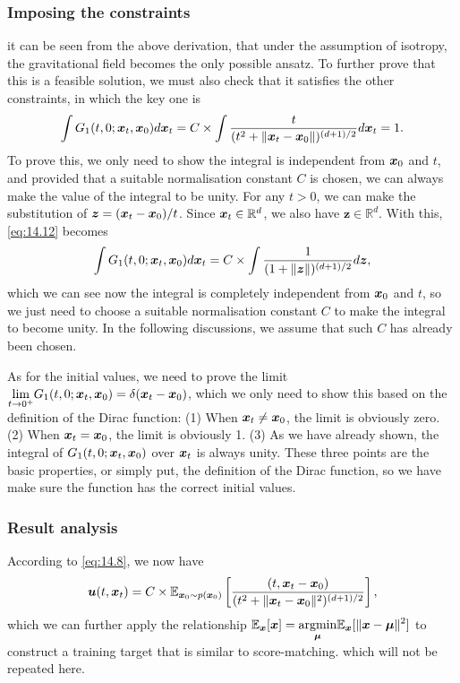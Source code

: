 \subsubsection{Imposing the constraints}
it can be seen from the above derivation, that under the assumption of isotropy, the gravitational field becomes the only possible ansatz. To further prove that this is a feasible solution, we must also check that it satisfies the other constraints, in which the key one is 
\begin{equation}
    \label{eq:14.12}
    \int G_{1}(t,0;\bm{x}_{t},\bm{x}_0)d\bm{x}_{t}=C\times\int\frac{t}{(t^2+\|\bm{x}_{t}-\bm{x}_0\|)^{(d+1)/2}}d\bm{x}_{t}=1.
\end{equation}
To prove this, we only need to show the integral is independent from $\bm{x}_0$ and $t$, and provided that a suitable normalisation constant $C$ is chosen, we can always make the value of the integral to be unity. For any $t>0$, we can make the substitution of $\bm{z}=(\bm{x}_{t}-\bm{x}_0)/t$. Since $\bm{x}_{t}\in\mathbb{R}^d$, we also have $\bm{z}\in\mathbb{R}^d$. With this, \cref{eq:14.12} becomes
\begin{equation}
    \label{eq:14.13}
     \int G_{1}(t,0;\bm{x}_{t},\bm{x}_0)d\bm{x}_{t}=C\times\int\frac{1}{(1+\|\bm{z}\|)^{(d+1)/2}}d\bm{z},
\end{equation}
which we can see now the integral is completely independent from $\bm{x}_0$ and $t$, so we just need to choose a suitable normalisation constant $C$ to make the integral to become unity. In the following discussions, we assume that such $C$ has already been chosen. 

As for the initial values, we need to prove the limit $\displaystyle{\lim_{t\to 0^+}} G_{1}(t,0;\bm{x}_{t},\bm{x}_0)=\delta (\bm{x}_{t}-\bm{x}_0)$, which we only need to show this based on the definition of the Dirac function: (1) When $\bm{x}_{t}\neq\bm{x}_0$, the limit is obviously zero. (2) When $\bm{x}_{t}=\bm{x}_0$, the limit is obviously 1. (3) As we have already shown, the integral of $G_{1}(t,0;\bm{x}_{t},\bm{x}_0)$ over $\bm{x}_t$ is always unity. These three points are the basic properties, or simply put, the definition of the Dirac function, so we have make sure the function has the correct initial values.

\subsubsection{Result analysis}
According to \cref{eq:14.8}, we now have 
\begin{equation}
    \label{eq:14.14}
    \bm{u}(t,\bm{x}_{t})=C\times \mathbb{E}_{\bm{x}_0\sim p(\bm{x}_0)}\left[\frac{(t,\bm{x}_{t}-\bm{x}_0)}{(t^2+\|\bm{x}_{t}-\bm{x}_0\|^2)^{(d+1)/2}}\right],
\end{equation}
which we can further apply the relationship $\mathbb{E}_{\bm{x}}[\bm{x}]=\displaystyle{\operatorname*{argmin}_{\bm{\mu}}}\mathbb{E}_{\bm{x}}[\|\bm{x}-\bm{\mu}\|^2]$ to construct a training target that is similar to score-matching. which will not be repeated here.

